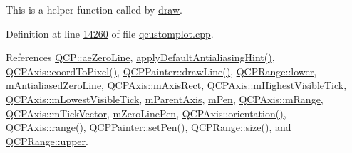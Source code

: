 This is a helper function called by \hyperlink{a00116_a2e9b3d14dffa43c79835869d488936c9}{draw}. 

Definition at line \hyperlink{a00115_source_l14260}{14260} of file \hyperlink{a00115_source}{qcustomplot.\+cpp}.



References \hyperlink{a00116_source_l00118}{Q\+C\+P\+::ae\+Zero\+Line}, \hyperlink{a00116_a04062908d31c258aea6a7f9760c8431b}{apply\+Default\+Antialiasing\+Hint()}, \hyperlink{a00115_source_l04531}{Q\+C\+P\+Axis\+::coord\+To\+Pixel()}, \hyperlink{a00115_source_l13191}{Q\+C\+P\+Painter\+::draw\+Line()}, \hyperlink{a00116_source_l01331}{Q\+C\+P\+Range\+::lower}, \hyperlink{a00116_source_l01606}{m\+Antialiased\+Zero\+Line}, \hyperlink{a00116_source_l01836}{Q\+C\+P\+Axis\+::m\+Axis\+Rect}, \hyperlink{a00116_source_l01865}{Q\+C\+P\+Axis\+::m\+Highest\+Visible\+Tick}, \hyperlink{a00116_source_l01865}{Q\+C\+P\+Axis\+::m\+Lowest\+Visible\+Tick}, \hyperlink{a00116_source_l01604}{m\+Parent\+Axis}, \hyperlink{a00116_source_l01607}{m\+Pen}, \hyperlink{a00116_source_l01833}{Q\+C\+P\+Axis\+::m\+Range}, \hyperlink{a00116_source_l01831}{Q\+C\+P\+Axis\+::m\+Tick\+Vector}, \hyperlink{a00116_source_l01607}{m\+Zero\+Line\+Pen}, \hyperlink{a00116_source_l01810}{Q\+C\+P\+Axis\+::orientation()}, \hyperlink{a00116_source_l01705}{Q\+C\+P\+Axis\+::range()}, \hyperlink{a00115_source_l13149}{Q\+C\+P\+Painter\+::set\+Pen()}, \hyperlink{a00115_source_l02414}{Q\+C\+P\+Range\+::size()}, and \hyperlink{a00116_source_l01331}{Q\+C\+P\+Range\+::upper}.


